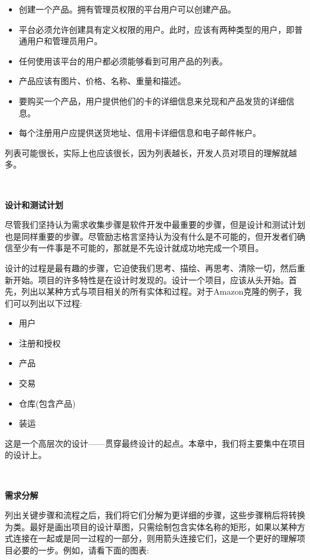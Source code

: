 \begin{itemize}
	\item 创建一个产品。拥有管理员权限的平台用户可以创建产品。
	\item 平台必须允许创建具有定义权限的用户。此时，应该有两种类型的用户，即普通用户和管理员用户。
	\item 任何使用该平台的用户都必须能够看到可用产品的列表。
	\item 产品应该有图片、价格、名称、重量和描述。
	\item 要购买一个产品，用户提供他们的卡的详细信息来兑现和产品发货的详细信息。
	\item 每个注册用户应提供送货地址、信用卡详细信息和电子邮件帐户。
\end{itemize}

列表可能很长，实际上也应该很长，因为列表越长，开发人员对项目的理解就越多。 \par

\noindent\textbf{}\ \par
\textbf{设计和测试计划} \ \par
尽管我们坚持认为需求收集步骤是软件开发中最重要的步骤，但是设计和测试计划也是同样重要的步骤。尽管励志格言坚持认为没有什么是不可能的，但开发者们确信至少有一件事是不可能的，那就是不先设计就成功地完成一个项目。 \par
设计的过程是最有趣的步骤，它迫使我们思考、描绘、再思考、清除一切，然后重新开始。项目的许多特性是在设计时发现的。设计一个项目，应该从头开始。首先，列出以某种方式与项目相关的所有实体和过程。对于Amazon克隆的例子，我们可以列出以下过程: \par

\begin{itemize}
	\item 用户
	\item 注册和授权
	\item 产品
	\item 交易
	\item 仓库(包含产品)
	\item 装运
\end{itemize}

这是一个高层次的设计——贯穿最终设计的起点。本章中，我们将主要集中在项目的设计上。 \par

\noindent\textbf{}\ \par
\textbf{需求分解} \ \par
列出关键步骤和流程之后，我们将它们分解为更详细的步骤，这些步骤稍后将转换为类。最好是画出项目的设计草图，只需绘制包含实体名称的矩形，如果以某种方式连接在一起或是同一过程的一部分，则用箭头连接它们，这是一个更好的理解项目必要的一步。例如，请看下面的图表: \par

